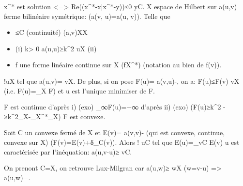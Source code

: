 x^* est solution <=> Re((x^*-x|x^*-y))≤0 \forall y\in C.
X espace de Hilbert sur \R a(u,v) ferme bilinéaire symétrique: (a(v, u)=a(u, v)).
Telle que
\begin{itemize}
	\item {}≤C (continuité) \forall(a,v)\in X\times X
	\item (i) \exists k> 0 a(u,u)≥k^2 \foral u\in X (ii) 
	\item f une forme linéaire continue sur X (f\in X^*) (notation  au bien de f(v)).
\end{itemize}
\begin{theorem}
	\exists!u\in X tel que a(u,v)= \forall v\in X. De plus, si on pose F(u)= a(v,u)-, on a: F(u)≤F(v) \forall v\in X (i.e. F(u)=\min_X F) et u est l'unique minimiser de F.
\end{theorem}
\begin{remark}
	F est continue d'après i) (exo) \lim_{\to ∞}F(u)=+∞ d'après ii) (exo) (F(u)≥k^2 - ≥k^2_X-_{X^*}_X) F est convexe.
\end{remark}
\begin{corollary}[Stampacchia]
	Soit C un convexe fermé de X et E(v)= a(v,v)- (qui est convexe, continue, convexe sur X)
	(F(v)=E(v)+δ_C(v)).
	Alors \exists! u\in C tel que E(u)=\inf_{v\in C} E(v) u est caractérisée par l'inéquation:
	a(u,v-u)≥ \forall v\in C. 
\end{corollary}
\begin{remark}
	On prenont C=X, on retrouve Lux-Milgran car a(u,w)≥ \forall w\in X (w=v-u) => a(u,w)=.
\end{remark}
